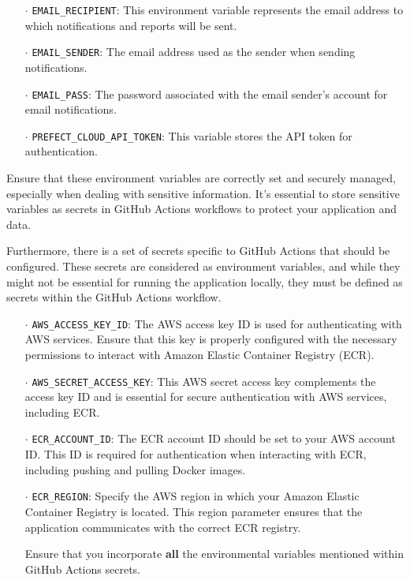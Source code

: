 \documentclass{report}
\begin{document}
\begin{itemize}
  \item[$\cdot$] \texttt{EMAIL\_RECIPIENT}: This environment variable represents the email address to which notifications and reports will be sent.

  \item[$\cdot$] \texttt{EMAIL\_SENDER}: The email address used as the sender when sending notifications.

  \item[$\cdot$] \texttt{EMAIL\_PASS}: The password associated with the email sender's account for email notifications.

  \item[$\cdot$] \texttt{PREFECT\_CLOUD\_API\_TOKEN}: This variable stores the API token for authentication.


\end{itemize}

Ensure that these environment variables are correctly set and securely managed, especially when dealing with sensitive information. It's essential to store sensitive variables as secrets in GitHub Actions workflows to protect your application and data.

Furthermore, there is a set of secrets specific to GitHub Actions that should be configured. These secrets are considered as environment variables, and while they might not be essential for running the application locally, they must be defined as secrets within the GitHub Actions workflow. 
\begin{itemize}
  \item[$\cdot$] \texttt{AWS\_ACCESS\_KEY\_ID}: The AWS access key ID is used for authenticating with AWS services. Ensure that this key is properly configured with the necessary permissions to interact with Amazon Elastic Container Registry (ECR).

  \item[$\cdot$] \texttt{AWS\_SECRET\_ACCESS\_KEY}: This AWS secret access key complements the access key ID and is essential for secure authentication with AWS services, including ECR.

  \item[$\cdot$] \texttt{ECR\_ACCOUNT\_ID}: The ECR account ID should be set to your AWS account ID. This ID is required for authentication when interacting with ECR, including pushing and pulling Docker images.

  \item[$\cdot$] \texttt{ECR\_REGION}: Specify the AWS region in which your Amazon Elastic Container Registry is located. This region parameter ensures that the application communicates with the correct ECR registry.

Ensure that you incorporate \textbf{all} the environmental variables mentioned within GitHub Actions secrets.
\end{itemize}
\end{document}

